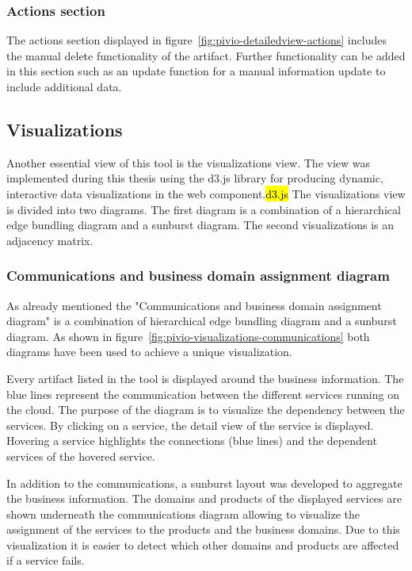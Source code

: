\subsubsection{Actions section}

The actions section displayed in figure~\ref{fig:pivio-detailedview-actions} includes the manual delete functionality of the artifact. Further functionality can be added in this section such as an update function for a manual information update to include additional data.

\subsection{Visualizations}\label{subsection:visualizations}

Another essential view of this tool is the visualizations view. The view was implemented during this thesis using the d3.js library for producing dynamic, interactive data visualizations in the web component.\hl{d3.js} The visualizations view is divided into two diagrams. The first diagram is a combination of a hierarchical edge bundling diagram and a sunburst diagram. The second visualizations is an adjacency matrix.

\subsubsection{Communications and business domain assignment diagram}

As already mentioned the "Communications and business domain assignment diagram" is a combination of hierarchical edge bundling diagram and a sunburst diagram. As shown in figure~\ref{fig:pivio-visualizations-communications} both diagrams have been used to achieve a unique visualization.

Every artifact listed in the tool is displayed around the business information. The blue lines represent the communication between the different services running on the cloud. The purpose of the diagram is to visualize the dependency between the services. By clicking on a service, the detail view of the service is displayed. Hovering a service highlights the connections (blue lines) and the dependent services of the hovered service.

In addition to the communications, a sunburst layout was developed to aggregate the business information. The domains and products of the displayed services are shown underneath the communications diagram allowing to visualize the assignment of the services to the products and the business domains. Due to this visualization it is easier to detect which other domains and products are affected if a service fails.

